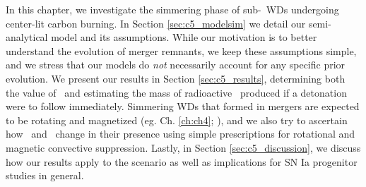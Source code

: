 In this chapter, we investigate the simmering phase of sub-\Mch\ WDs undergoing center-lit {\charles carbon burning}.  In Section \ref{sec:c5_modelsim} we detail our semi-analytical model and its assumptions.  While our motivation is to better understand the evolution of merger remnants, we keep these assumptions simple, and we stress that our models do \textit{not} necessarily account for any specific prior evolution.  We present our results in Section \ref{sec:c5_results}, determining both the value of \Mcrit\ and estimating the mass of radioactive \Ni\ produced if a detonation were to follow immediately.  Simmering WDs that formed in mergers are expected to be rotating and magnetized (eg. Ch. \ref{ch:ch4}; \citealt{ji+13, wicktf14}), and we also try to ascertain how \Mcrit\ and \MNi\ change in their presence using simple prescriptions for rotational and magnetic convective suppression.  Lastly, in Section \ref{sec:c5_discussion}, we discuss how our results apply to the \citeal{vkercj10} scenario as well as implications for SN Ia progenitor studies in general.
